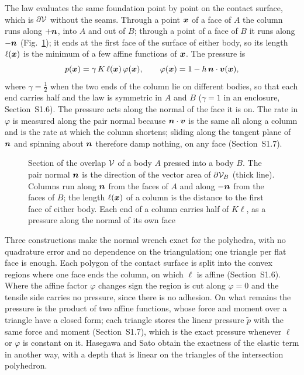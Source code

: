 The law  evaluates the same foundation point by point on the contact surface,
which is $\partial\mathcal{V}$ without the seams. Through a point $\boldsymbol{x}$ of a face of $A$ the column
runs along $+\boldsymbol{n}$, into $A$ and out of $B$; through a point of a face of $B$ it runs along $-\boldsymbol{n}$
(Fig.~\ref{fig:columns}); it ends at the first face of the surface of either body, so its
length $\ell(\boldsymbol{x})$ is the minimum of a few affine functions of $\boldsymbol{x}$. The pressure is
\begin{equation}
  p(\boldsymbol{x}) = \gamma\,K\,\ell(\boldsymbol{x})\,\varphi(\boldsymbol{x}), \qquad \varphi(\boldsymbol{x}) = 1 - h\,\boldsymbol{n}\cdot\boldsymbol{v}(\boldsymbol{x}) ,
  \label{eq:pressure}
\end{equation}
where $\gamma = \tfrac12$ when the two ends of the column lie on different bodies, so that each
end carries half and the law is symmetric in $A$ and $B$ ($\gamma = 1$ in an enclosure,
Section~S1.6). The pressure acts along the normal of the face it is on. The rate in $\varphi$
is measured along the pair normal because $\boldsymbol{n}\cdot\boldsymbol{v}$ is the same all along a column and is
the rate at which the column shortens; sliding along the tangent plane of $\boldsymbol{n}$ and spinning
about $\boldsymbol{n}$ therefore damp nothing, on any face (Section~S1.7).

\begin{figure}[t]
\centering

\caption{Section of the overlap $\mathcal{V}$ of a body $A$ pressed into a body $B$. The pair
normal $\boldsymbol{n}$ is the direction of the vector area of $\partial\mathcal{V}_B$ (thick line). Columns run
along $\boldsymbol{n}$ from the faces of $A$ and along $-\boldsymbol{n}$ from the faces of $B$; the length $\ell(\boldsymbol{x})$ of a
column is the distance to the first face of either body. Each end of a column carries half of
$K\ell$, as a pressure along the normal of its own face}
\label{fig:columns}
\end{figure}

Three constructions make the normal wrench exact for the polyhedra, with no quadrature error
and no dependence on the triangulation; one triangle per flat face is enough. Each polygon of
the contact surface is split into the convex regions where one face ends the column, on which
$\ell$ is affine (Section~S1.6). Where the affine factor $\varphi$ changes sign the region is
cut along $\varphi = 0$ and the tensile side carries no pressure, since there is no adhesion.
On what remains the pressure is the product of two affine functions, whose force and moment
over a triangle have a closed form; each triangle stores the linear pressure $\tilde p$ with
the same force and moment (Section~S1.7), which is the exact pressure whenever $\ell$ or
$\varphi$ is constant on it. Hasegawa and Sato \cite{Hasegawa2004} obtain the exactness of the
elastic term in another way, with a depth that is linear on the triangles of the intersection
polyhedron.

